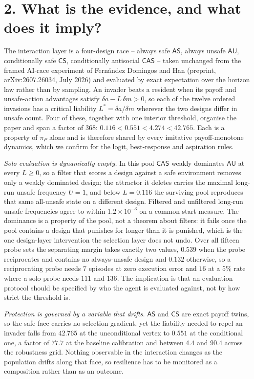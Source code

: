 \documentclass[10pt,a4paper]{article}
\newcommand{\AS}{\textsf{AS}}
\newcommand{\AU}{\textsf{AU}}
\newcommand{\CS}{\textsf{CS}}
\newcommand{\CAS}{\textsf{CAS}}
\begin{document}
\section*{2. What is the evidence, and what does it imply?}

The interaction layer is a four-design race -- always safe $\AS$, always unsafe
$\AU$, conditionally safe $\CS$, conditionally antisocial $\CAS$ -- taken
unchanged from the framed AI-race experiment of Fern\'{a}ndez Domingos and Han
(preprint, arXiv:2607.26034, July 2026) and evaluated by exact expectation over
the horizon law rather than by sampling. An invader beats a resident when its
payoff and unsafe-action advantages satisfy $\delta a-L\,\delta m>0$, so each
of the twelve ordered invasions has a critical liability
$L^{*}=\delta a/\delta m$ wherever the two designs differ in unsafe count.
Four of these, together with one interior threshold, organise the paper and
span a factor of $368$: $0.116<0.551<4.274<42.765$. Each is a property of
$\pi_{P}$ alone and is therefore shared by every imitative payoff-monotone
dynamics, which we confirm for the logit, best-response and aspiration rules.

\emph{Solo evaluation is dynamically empty.} In this pool $\CAS$ weakly
dominates $\AU$ at every $L\ge0$, so a filter that scores a design against a
safe environment removes only a weakly dominated design; the attractor it
deletes carries the maximal long-run unsafe frequency $U=1$, and below
$L=0.116$ the surviving pool reproduces that same all-unsafe state on a
different design. Filtered and unfiltered long-run unsafe frequencies agree to
within $1.2\times10^{-3}$ on a common start measure. The dominance is a
property of the pool, not a theorem about filters: it fails once the pool
contains a design that punishes for longer than it is punished, which is the
one design-layer intervention the selection layer does not undo. Over all
fifteen probe sets the separating margin takes exactly two values, $0.539$ when
the probe reciprocates and contains no always-unsafe design and $0.132$
otherwise, so a reciprocating probe needs $7$ episodes at zero execution error
and $16$ at a $5\%$ rate where a solo probe needs $111$ and $136$. The
implication is that an evaluation protocol should be specified by who the agent
is evaluated against, not by how strict the threshold is.

\emph{Protection is governed by a variable that drifts.} $\AS$ and $\CS$ are
exact payoff twins, so the safe face carries no selection gradient, yet the
liability needed to repel an invader falls from $42.765$ at the unconditional
vertex to $0.551$ at the conditional one, a factor of $77.7$ at the baseline
calibration and between $4.4$ and $90.4$ across the robustness grid. Nothing
observable in the interaction changes as the population drifts along that face,
so resilience has to be monitored as a composition rather than as an outcome.
\end{document}
